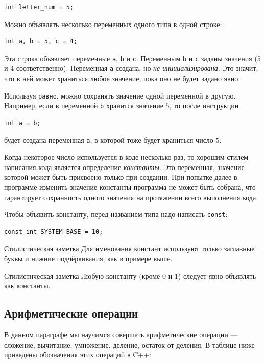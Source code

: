 \documentclass{article}
\newcommand{\style}[1]{
	\begin{sectionenv}[green!30!white]{Стилистическая заметка}
		#1
	\end{sectionenv}
}
\begin{document}
	\begin{lstlisting}
int letter_num = 5;
	\end{lstlisting}
	
	Можно объявлять несколько переменных одного типа в одной строке:
	
	\begin{lstlisting}
int a, b = 5, c = 4;
	\end{lstlisting}
	
	Эта строка объявляет переменные \texttt{a}, \texttt{b} и \texttt{c}. Переменным \texttt{b} и \texttt{c} заданы значения (5 и 4 соответственно). Переменная \texttt{a} создана, но \textit{не инициализирована}. Это значит, что в ней может храниться любое значение, пока оно не будет задано явно.
	
	Используя \texttt{равно}, можно сохранять значение одной переменной в другую. Например, если в переменной \texttt{b} хранится значение $5$, то после инструкции
	
	\begin{lstlisting}
int a = b;
	\end{lstlisting}
	
	будет создана переменная \texttt{a}, в которой тоже будет храниться число $5$.
	
	Когда некоторое число используется в коде несколько раз, то хорошим стилем написания кода является определение \textit{константы}. Это переменная, значение которой может быть присвоено только при создании. При попытке далее в программе изменить значение константы программа не может быть собрана, что гарантирует сохранность одного значения на протяжении всего выполнения кода.
	
	Чтобы объявить константу, перед названием типа надо написать \texttt{const}:
	
	\begin{lstlisting}
const int SYSTEM_BASE = 10;
	\end{lstlisting}
	
	\style{Для именования констант используют только заглавные буквы и нижние подчёркивания, как в примере выше.}
	
	\style{Любую константу (кроме $0$ и $1$) следует явно объявлять как константы.}
	
	\subsection{Арифметические операции}
	
	В данном параграфе мы научимся совершать арифметические операции --- сложение, вычитание, умножение, деление, остаток от деления. В таблице ниже приведены обозначения этих операций в C++:
	
\end{document}
